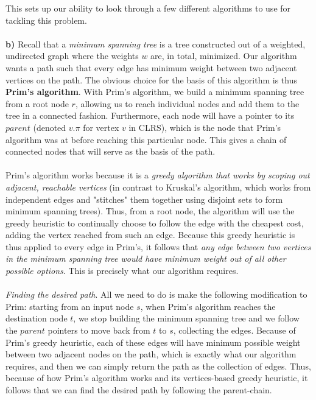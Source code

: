 \documentclass[11pt]{article}
\begin{document}
\begin{solution}
\begin{itemize}
\end{itemize}
This sets up our ability to look through a few different algorithms to use for tackling this problem.
\\\\
\textbf{b)} Recall that a \textit{minimum spanning tree} is a tree constructed out of a weighted, undirected graph where the weights $w$ are, in total, minimized. Our algorithm wants a path such that every edge has minimum weight between two adjacent vertices on the path. The obvious choice for the basis of this algorithm is thus \textbf{Prim's algorithm}. With Prim's algorithm, we build a minimum spanning tree from a root node $r$, allowing us to reach individual nodes and add them to the tree in a connected fashion. Furthermore, each node will have a pointer to its $parent$ (denoted $v.\pi$ for vertex $v$ in CLRS), which is the node that Prim's algorithm was at before reaching this particular node. This gives a chain of connected nodes that will serve as the basis of the path.
\\\\
Prim's algorithm works because it is a \textit{greedy algorithm that works by scoping out adjacent, reachable vertices} (in contrast to Kruskal's algorithm, which works from independent edges and "stitches" them together using disjoint sets to form minimum spanning trees). Thus, from a root node, the algorithm will use the greedy heuristic to continually choose to follow the edge with the cheapest cost, adding the vertex reached from such an edge. Because this greedy heuristic is thus applied to every edge in Prim's, it follows that \textit{any edge between two vertices in the minimum spanning tree would have minimum weight out of all other possible options}. This is precisely what our algorithm requires.
\\\\
\textit{Finding the desired path}. All we need to do is make the following modification to Prim: starting from an input node $s$, when Prim's algorithm reaches the destination node $t$, we stop building the minimum spanning tree and we follow the $parent$ pointers to move back from $t$ to $s$, collecting the edges. Because of Prim's greedy heuristic, each of these edges will have minimum possible weight between two adjacent nodes on the path, which is exactly what our algorithm requires, and then we can simply return the path as the collection of edges. Thus, because of how Prim's algorithm works and its vertices-based greedy heuristic, it follows that we can find the desired path by following the parent-chain.

\end{solution}
\end{document}

